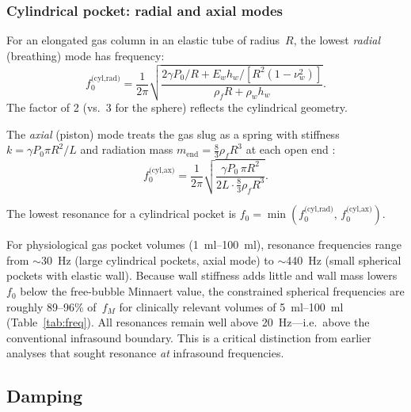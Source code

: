\documentclass[12pt]{article}
\begin{document}
\subsubsection{Cylindrical pocket: radial and axial modes}

For an elongated gas column in an elastic tube of radius~$R$, the lowest
\emph{radial} (breathing) mode has frequency:
\begin{equation}
  f_0^\text{(cyl,rad)} = \frac{1}{2\pi}\sqrt{
    \frac{2\gamma P_0 / R + E_w h_w / [R^2(1-\nu_w^2)]}{\rho_f R + \rho_w h_w}
  }.
  \label{eq:f0_cyl_rad}
\end{equation}
The factor of 2 (vs.\ 3 for the sphere) reflects the cylindrical geometry.

The \emph{axial} (piston) mode treats the gas slug as a spring with
stiffness $k = \gamma P_0 \pi R^2 / L$ and radiation mass
$m_\text{end} = \tfrac{8}{3}\rho_f R^3$ at each open end
\citep{Leighton1994}:
\begin{equation}
  f_0^\text{(cyl,ax)} = \frac{1}{2\pi}\sqrt{
    \frac{\gamma P_0\,\pi R^2}{2L \cdot \tfrac{8}{3}\rho_f R^3}
  }.
  \label{eq:f0_cyl_ax}
\end{equation}

The lowest resonance for a cylindrical pocket is
$f_0 = \min(f_0^\text{(cyl,rad)},\, f_0^\text{(cyl,ax)})$.

For physiological gas pocket volumes (\SIrange{1}{100}{\milli\litre}),
resonance frequencies range from $\sim$\SI{30}{\hertz} (large cylindrical
pockets, axial mode) to $\sim$\SI{440}{\hertz} (small spherical pockets
with elastic wall).  Because wall stiffness adds little and wall mass
lowers $f_0$ below the free-bubble Minnaert value, the constrained
spherical frequencies are roughly 89--96\% of~$f_M$ for clinically
relevant volumes of \SIrange{5}{100}{\milli\litre}
(Table~\ref{tab:freq}).  All resonances remain well above
\SI{20}{\hertz}---i.e.\ above the conventional infrasound boundary.  This
is a critical distinction from earlier analyses that sought resonance
\emph{at} infrasound frequencies.


\subsection{Damping}
\label{sec:damping}
\end{document}
